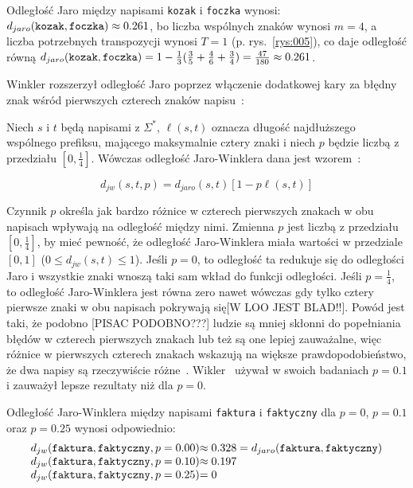 \documentclass{praca1}
\begin{document}
\begin{example}
Odległość Jaro między napisami \verb|kozak| i \verb|foczka| wynosi: $d_{jaro}(\verb|kozak|, \verb|foczka|)  \approx 0.261$, bo liczba wspólnych znaków wynosi $m = 4$, a liczba potrzebnych transpozycji wynosi $T = 1$ (p. rys.~\ref{rys:005}), co daje odległość równą $d_{jaro}(\verb|kozak|, \verb|foczka|) = 1 - \frac{1}{3}(\frac{3}{5} + \frac{4}{6} + \frac{3}{4}) = \frac{47}{180} \approx 0.261$.
\end{example}

Winkler rozszerzył odległość Jaro poprzez włączenie dodatkowej kary za błędny znak wśród pierwszych czterech znaków napisu~\cite{Loo2014:stringdist}:

\begin{definition}
Niech $s$ i $t$ będą napisami z $\Sigma^*$, $\ell(s,t)$ oznacza długość najdłuższego wspólnego prefiksu, mającego maksymalnie cztery znaki i niech $p$ będzie liczbą z przedziału $[0, \frac{1}{4}]$. Wówczas odległość Jaro-Winklera dana jest wzorem~\cite{Winkler1990:stringcomparator}:

\begin{equation}
\label{eq:012}
d_{jw}(s,t, p) = d_{jaro}(s,t)[1 - p\ell(s,t)]
\end{equation}
\end{definition}

Czynnik $p$ określa jak bardzo różnice w czterech pierwszych znakach w obu napisach wpływają na odległość między nimi. Zmienna $p$ jest liczbą z przedziału $[0, \frac{1}{4}]$, by mieć pewność, że odległość Jaro-Winklera miała wartości w przedziale $[0,1]$ ($0 \leq d_{jw}(s,t) \leq 1$). Jeśli $p=0$, to odległość ta redukuje się do odległości Jaro i wszystkie znaki wnoszą taki sam wkład do funkcji odległości. Jeśli $p = \frac{1}{4}$, to odległość Jaro-Winklera jest równa zero nawet wówczas gdy tylko cztery pierwsze znaki w obu napisach pokrywają się[W LOO JEST BLAD!!]. Powód jest taki, że podobno [PISAC PODOBNO???] ludzie są mniej skłonni do popełniania błędów w czterech pierwszych znakach lub też są one lepiej zauważalne, więc różnice w pierwszych czterech znakach wskazują na większe prawdopodobieństwo, że dwa napisy są rzeczywiście różne~\cite{Loo2014:stringdist}. Wikler~\cite{Winkler1990:stringcomparator} używał w swoich badaniach $p = 0.1$ i zauważył lepsze rezultaty niż dla $p = 0$.

\begin{example}
Odległość Jaro-Winklera między napisami \verb|faktura| i \verb|faktyczny| dla $p = 0$, $p = 0.1$ oraz $p = 0.25$ wynosi odpowiednio: 
\begin{equation*}
  \left.\begin{array}{l@{}l}
    d_{jw}(\verb|faktura|, \verb|faktyczny|, p = 0.00) & \approx 0.328 = d_{jaro}(\verb|faktura|, \verb|faktyczny|) \\
    d_{jw}(\verb|faktura|, \verb|faktyczny|, p = 0.10) & \approx 0.197  \\
    d_{jw}(\verb|faktura|, \verb|faktyczny|, p = 0.25) & =  0
  \end{array}\right.
\end{equation*}
\end{example}
\end{document}
